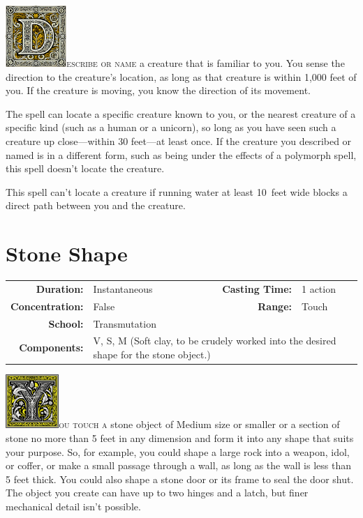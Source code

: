 \documentclass[12pt,showtrims]{memoir}
\begin{document}
\vspace{1\baselineskip}\noindent 
\lettrine[lines=4]{\includegraphics[height=66pt]{initials/D.png}}{escribe or
name} a creature that is familiar to you. You sense the direction to the
creature’s location, as long as that creature is within 1,000 feet of you. If
the creature is moving, you know the direction of its movement.

The spell can locate a specific creature known to you, or the nearest creature
of a specific kind (such as a human or a unicorn), so long as you have seen
such a creature up close—within 30 feet—at least once. If the creature you
described or named is in a different form, such as being under the effects of a
polymorph spell, this spell doesn’t locate the creature.

This spell can’t locate a creature if running water at least 10~feet wide
blocks a direct path between you and the creature.

\newpage
\section*{Stone Shape}

{
\small\centering\vspace{-6pt}
\begin{tabular}{rlrl}
\toprule

\textbf{Duration:} & Instantaneous &
\textbf{Casting Time:} & 1 action \\
\textbf{Concentration:} & False &
\textbf{Range:} & Touch \\
\textbf{School:} & Transmutation \\
\textbf{Components:} & \multicolumn{3}{p{0.7\textwidth}}{V, S, M (Soft clay, to be crudely worked into the desired shape for the stone object.)}\\

\bottomrule
\end{tabular}
}

\vspace{1\baselineskip}\noindent 
\lettrine[lines=4]{\includegraphics[height=58pt]{initials/Y.png}}{ou touch a} stone object of Medium size or smaller or a section of stone no more than 5 feet in any dimension and form it into any shape that suits your purpose. So, for example, you could shape a large rock into a weapon, idol, or coffer, or make a small passage through a wall, as long as the wall is less than 5 feet thick. You could also shape a stone door or its frame to seal the door shut. The object you create can have up to two hinges and a latch, but finer mechanical detail isn't possible.
\end{document}

